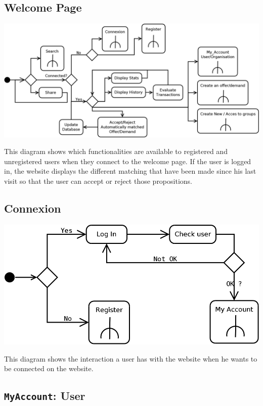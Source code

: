 \subsection{Welcome Page}

\begin{center}
	\includegraphics[width=.75\textwidth]{WelcomePage.png}
\end{center}
This diagram shows which functionalities are available to registered and unregistered users when they connect to the welcome page. If the user is logged in, the website displays the different matching that have been made since his last visit so that the user can accept or reject those propositions.

\subsection{Connexion}

\begin{center}
	\includegraphics[width=.65\textwidth]{Connexion.png}
\end{center}
This diagram shows the interaction a user has with the website when he wants to be connected on the website.

\subsection{\texttt{MyAccount}: User}

